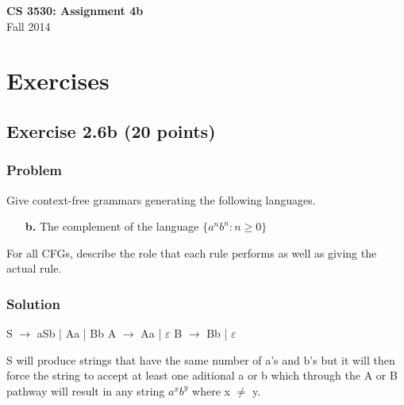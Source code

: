 \documentclass{article}
\begin{document}
\begin{empfile}

\begin{center}
\textbf{\Large CS 3530: Assignment 4b} \\[2mm]
Fall 2014
\end{center}

\raggedright

\section*{Exercises}

\subsection*{Exercise 2.6b (20 points)}

\subsubsection*{Problem}

Give context-free grammars generating the following languages.

\begin{enumerate}
\item[\textbf{b.}] The complement of the language $\{a^n b^n:n\geq 0\}$
\end{enumerate}

For all CFGs, describe the role that each rule performs as well as
giving the actual rule.

\subsubsection*{Solution}

S $\rightarrow$ aSb | Aa | Bb \newline
A $\rightarrow$ Aa | $\varepsilon$ \newline
B $\rightarrow$ Bb | $\varepsilon$ \newline

S will produce strings that have the same number of a's and b's but it will then 
force the string to accept at least one aditional a or b which through the A or B
pathway will result in any string $a^x b^y$ where x $\ne$ y.

\end{empfile}
\immediate{}
\end{document}
